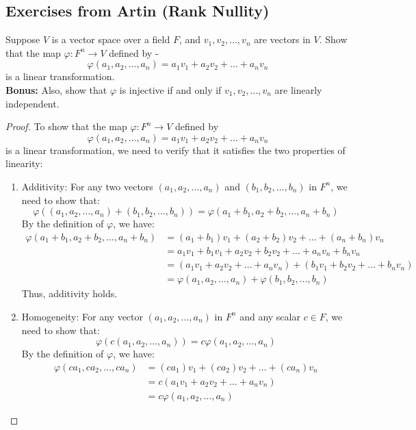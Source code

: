\documentclass[openany]{book}
\begin{document}
\subsection{Exercises from Artin (Rank Nullity)}
\begin{exercise}
Suppose $V$ is a vector space over a field $F$, and $v_1, v_2, \ldots, v_n$ are vectors in $V$. Show that the map $\varphi: F^n \to V$ defined by - 
$$\varphi(a_1, a_2, \ldots, a_n) = a_1 v_1 + a_2 v_2 + \ldots + a_n v_n$$
is a linear transformation. \\ 
\textbf{Bonus:} Also, show that $\varphi$ is injective if and only if $v_1, v_2, \ldots, v_n$ are linearly independent.
\end{exercise}
\begin{proof}
To show that the map $\varphi: F^n \to V$ defined by
$$\varphi(a_1, a_2, \ldots, a_n) = a_1 v_1 + a_2 v_2 + \ldots + a_n v_n$$
is a linear transformation, we need to verify that it satisfies the two properties of linearity:
\begin{enumerate}
\item Additivity: For any two vectors $(a_1, a_2, \ldots, a_n)$ and $(b_1, b_2, \ldots, b_n)$ in $F^n$, we need to show that:
   $$\varphi((a_1, a_2, \ldots, a_n) + (b_1, b_2, \ldots, b_n)) = \varphi(a_1 + b_1, a_2 + b_2, \ldots, a_n + b_n)$$
   By the definition of $\varphi$, we have:
   \[
   \begin{aligned}
   \varphi(a_1 + b_1, a_2 + b_2, \ldots, a_n + b_n) &= (a_1 + b_1)v_1 + (a_2 + b_2)v_2 + \ldots + (a_n + b_n)v_n \\
   &= a_1 v_1 + b_1 v_1 + a_2 v_2 + b_2 v_2 + \ldots + a_n v_n + b_n v_n \\
   &= (a_1 v_1 + a_2 v_2 + \ldots + a_n v_n) + (b_1 v_1 + b_2 v_2 + \ldots + b_n v_n) \\
   &= \varphi(a_1, a_2, \ldots, a_n) + \varphi(b_1, b_2, \ldots, b_n)
   \end{aligned}
   \]
   Thus, additivity holds.
\item Homogeneity: For any vector $(a_1, a_2, \ldots, a_n)$ in $F^n$ and any scalar $c \in F$, we need to show that:
   $$\varphi(c(a_1, a_2, \ldots, a_n)) = c \varphi(a_1, a_2, \ldots, a_n)$$
   By the definition of $\varphi$, we have:
   \[
   \begin{aligned}
   \varphi(c a_1, c a_2, \ldots, c a_n) &= (c a_1)v_1 + (c a_2)v_2 + \ldots + (c a_n)v_n \\
   &= c(a_1 v_1 + a_2 v_2 + \ldots + a_n v_n) \\
   &= c \varphi(a_1, a_2, \ldots, a_n)

\end{aligned}\]
\end{enumerate}
\end{proof}
\end{document}
